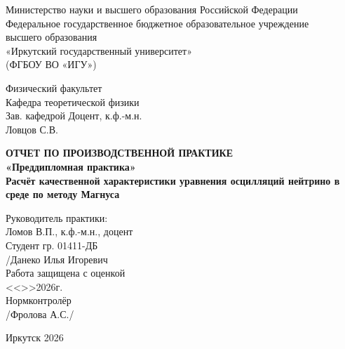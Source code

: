 \documentclass[a4paper,12pt]{article}
\begin{document}
\onehalfspacing
\pagestyle{plain}

\begin{titlepage}
	\begin{center}%
		Министерство науки и высшего образования Российской Федерации\\
		Федеральное государственное бюджетное образовательное учреждение\\
		высшего образования \\
		«Иркутский государственный университет»\\
		(ФГБОУ ВО «ИГУ»)\\
	\end{center}
	\vspace*{3em}
	
	\begin{flushright}
		\begin{minipage}{92mm}
			Физический факультет\\
			Кафедра теоретической физики\\
			Зав. кафедрой Доцент, к.ф.-м.н.\\
			Ловцов С.В. \underline{\hspace{35mm}}
		\end{minipage}
	\end{flushright}
	\vspace*{4em}
	
	\begin{center}
		\Large
		\bfseries%
		ОТЧЕТ ПО ПРОИЗВОДСТВЕННОЙ ПРАКТИКЕ\\
		«Преддипломная практика»\\[2ex]
		Расчёт качественной характеристики уравнения осцилляций нейтрино в среде по методу Магнуса
	\end{center}
	
	\vspace*{3em}
	
	\begin{flushright}
		\begin{minipage}{95mm}
			Руководитель практики: \underline{\hspace{35mm}}\\
			Ломов В.П., к.ф.-м.н., доцент\\[2ex]
			Студент гр. 01411-ДБ\\
			\underline{\hspace{35mm}}/Данеко Илья Игоревич\\[2ex]
			Работа защищена с оценкой \underline{\hspace{30mm}}\\
			<<\underline{\hspace{8mm}}>>\underline{\hspace{22mm}}2026г.\\
			Нормконтролёр\\
			\underline{\hspace{35mm}}/Фролова А.С./\\
		\end{minipage}
	\end{flushright}
	
	\vfill
	\begin{center}
		Иркутск 2026
	\end{center}
\end{titlepage}
\end{document}
